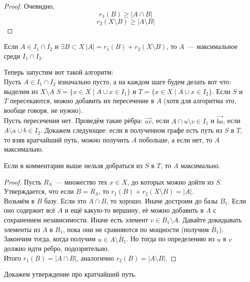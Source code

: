 \documentclass{article}
\begin{document}
    \begin{proof}
        Очевидно,
        $$r_1(B)\geqslant|A\cap B|$$
        $$
        r_2(X\setminus B)\geqslant|A\setminus B|
        $$
    \end{proof}
    \begin{corollary}
        Если $A\in I_1\cap I_2$ и $\exists B\subset X~|A|=r_1(B)+r_2(X\setminus B)$, то $A$~--- максимальное среди $I_1\cap I_2$.
    \end{corollary}
    \begin{remark}
        Теперь запустим вот такой алгоритм:\\
        Пусть $A\in I_1\cap I_2$ изначально пусто, а на каждом шаге будем делать вот что: выделим из $X\setminus A$ $S=\{x\in X\mid A\cup x\in I_1\}$ и $T=\{x\in X\mid A\cup x\in I_2\}$. Если $S$ и $T$ пересекаются, можно добавить их пересечение в $A$ (хотя для алгоритма это, вообще говоря, не нужно).\\
        Пусть пересечения нет. Проведём такие рёбра: $\vec{uv}$, если $A\cap u\setminus v\in I_1$ и $\vec{ba}$, если $A\setminus a\cup b\in I_2$. Докажем следующее: если в полученном графе есть путь из $S$ в $T$, то взяв кратчайший путь, можно получить $A$ побольше, а если нет, то $A$ максимально.
    \end{remark}
    \begin{claim}
        Если в комментарии выше нельзя добраться из $S$ в $T$, то $A$ максимально.
    \end{claim}
    \begin{proof}
        Пусть $R_S$~--- множество тех $x\in X$, до которых можно дойти из $S$. Утверждается, что если $B=\overline{R_S}$, то $r_1(B)+r_2(X\setminus B)=|A|$.\\
        Возьмём в $B$ базу. Если это $A\cap B$, то хорошо. Иначе достроим до базы $B_1$. Если оно содержит всё $A$ и ещё какую-то вершину, её можно добавить в $A$ с сохранением независимости. Иначе есть элемент $v\in B_1\setminus A$. Давайте докидывать элементы из $A$ в $B_1$, пока они не сравняются по мощности (получим $\widetilde{B_1}$). Закончим тогда, когда получим $u\in A\setminus\widetilde{B_1}$. Но тогда по определению из $u$ в $v$ должно идти ребро, подозрительно.\\
        Итого $r_1(B)=|A\cap B|$, аналогично $r_2(B)=|A\setminus B|$.
    \end{proof}
    \begin{claim}
        Докажем утверждение про кратчайший путь.
    \end{claim}
\end{document}
